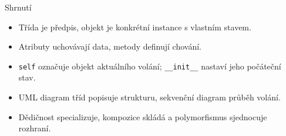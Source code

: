 \documentclass[aspectratio=169]{beamer}
\begin{document}
\begin{frame}{Shrnutí}
  \begin{itemize}
    \item Třída je předpis, objekt je konkrétní instance s vlastním stavem.
    \item Atributy uchovávají data, metody definují chování.
    \item \texttt{self} označuje objekt aktuálního volání; \texttt{\_\_init\_\_} nastaví jeho počáteční stav.
    \item UML diagram tříd popisuje strukturu, sekvenční diagram průběh volání.
    \item Dědičnost specializuje, kompozice skládá a polymorfismus sjednocuje rozhraní.
  \end{itemize}
\end{frame}
\end{document}
